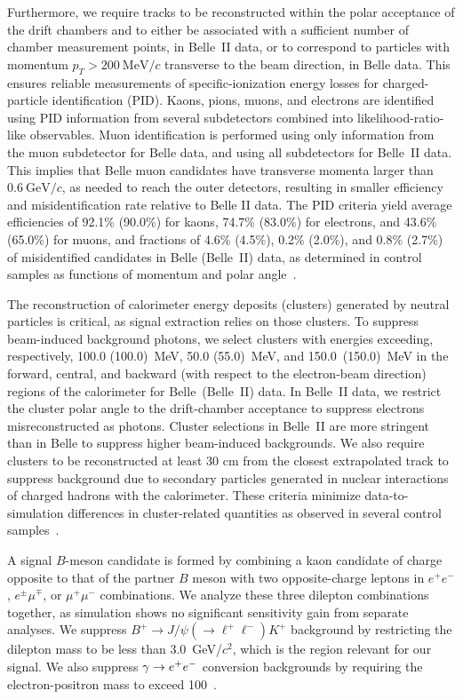 Furthermore, we require tracks to be reconstructed within the polar acceptance of the drift chambers and to either be associated with a sufficient number of chamber measurement points, in Belle~II data, or to correspond to particles with momentum $p_T>200~\mathrm{MeV} / c$ transverse to the beam direction, in Belle data. This ensures reliable measurements of specific-ionization energy losses for charged-particle identification (PID).
Kaons, pions, muons, and electrons are identified using PID information from several subdetectors combined into likelihood-ratio-like observables.
Muon identification is performed using only information from the muon subdetector for Belle data, and using all subdetectors for Belle~II data. This implies that Belle muon candidates have transverse momenta larger than $0.6~\mathrm{GeV} / c$, as needed to reach the outer detectors, resulting in smaller efficiency and misidentification rate relative to Belle II data. The PID criteria yield average efficiencies of 92.1\%  (90.0\%) for kaons, 74.7\% (83.0\%) for electrons, and 43.6\% (65.0\%) for muons, and fractions of 4.6\% (4.5\%), 0.2\% (2.0\%), and 0.8\% (2.7\%) of misidentified candidates in Belle (Belle~II) data, as determined in control samples as functions of momentum and polar angle~\cite{Belleii:hadronid}.



The reconstruction of calorimeter energy deposits (clusters) generated by neutral particles is critical, as signal extraction relies on those clusters. To suppress beam-induced background photons, we select clusters with energies exceeding, respectively, 100.0 (100.0)~MeV, 50.0 (55.0)~MeV, and 150.0~(150.0)~MeV in the forward, central, and backward (with respect to the electron-beam direction) regions of the calorimeter for Belle~(Belle~II) data. In Belle~II data, we restrict the cluster polar angle to the drift-chamber acceptance to suppress electrons misreconstructed as photons. Cluster selections in Belle~II are more stringent than in Belle to suppress higher beam-induced backgrounds. We also require clusters to be reconstructed at least 30 cm from the closest extrapolated
track to suppress background due to secondary particles generated in nuclear interactions of charged hadrons with the calorimeter. These criteria minimize data-to-simulation differences in cluster-related quantities as observed in  several control samples~\cite{debjit:thesis}.




A signal $B$-meson candidate is formed by combining a kaon candidate of charge opposite to that of the partner $B$ meson with two opposite-charge leptons in $e^+e^-$, $e^\pm\mu^\mp$, or $\mu^+\mu^-$ combinations. We analyze these three dilepton combinations together, as simulation shows no significant sensitivity gain from separate analyses. We suppress $B^+ \to J/\psi(\to \ell^+\ell^-)K^+$ background by restricting the dilepton mass to be less than $3.0$~GeV/$c^2$, which is the region relevant for our signal. We also
suppress $\gamma\rightarrow e^+e^-$ conversion backgrounds by requiring the electron-positron mass to exceed 100~\mevcc.

